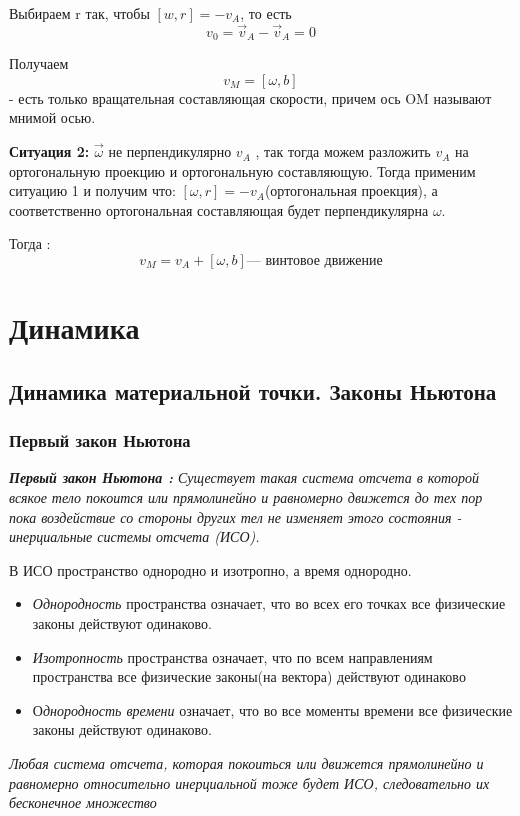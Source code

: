 \documentclass[12pt,a4paper]{report}
\begin{document}
Выбираем r  так, чтобы $[w,r] = -v_A$, то есть
\[ v_0 = \vec v_A - \vec v_A = 0 \]

Получаем \[ v_M = [\omega, b]\] - есть только вращательная составляющая скорости, причем ось OM называют мнимой осью.

\vspace{8px}

\textbf{Ситуация 2:} $\vec \omega$ не перпендикулярно $v_A$ , так тогда можем разложить $v_A$ на ортогональную проекцию и ортогональную составляющую. Тогда применим ситуацию 1 и получим что:
$[\omega,r] = -v_A$(ортогональная проекция), а соответственно ортогональная составляющая будет перпендикулярна $\omega$.

Тогда : \[ v_M = v_A + [\omega, b] \text{--- винтовое движение} \]

\chapter{Динамика}
\section{Динамика материальной точки. Законы Ньютона}
\subsection{Первый закон Ньютона}
\textit{\textbf{Первый закон Ньютона :} Существует такая система отсчета в которой всякое тело покоится или прямолинейно и равномерно движется до тех пор пока воздействие со стороны других тел не изменяет этого состояния - инерциальные системы отсчета (ИСО).}

\vspace{5px}

В ИСО пространство однородно и изотропно, а время однородно.
\begin{itemize}
    \item \textit{Однородность} пространства означает, что во всех его точках все физические законы действуют одинаково.
    \item \textit{Изотропность} пространства означает, что по всем направлениям пространства все физические законы(на вектора) действуют одинаково
    \item О\textit{днородность времени} означает, что во все моменты времени все физические законы действуют одинаково.
\end{itemize}
\textit{Любая система отсчета, которая покоиться или движется прямолинейно и равномерно относительно инерциальной тоже будет ИСО, следовательно их бесконечное множество}
\end{document}
